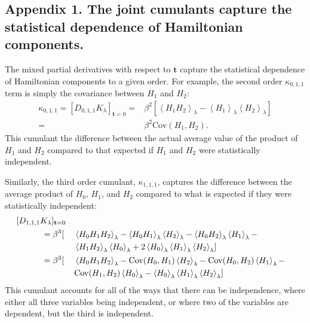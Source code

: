 \documentclass{article}
\let\vec\mathbf
\begin{document}
\subsection*{Appendix 1. The joint cumulants capture the statistical dependence of Hamiltonian components.}

The mixed partial derivatives with respect to $\vec t$ capture the statistical dependence of Hamiltonian components to a given order. For example, the second order $\kappa_{0,1,1}$ term is simply the covariance between $H_1$ and $H_2$:
\begin{align}
\kappa_{0, 1, 1} = [D_{0, 1, 1} K_\lambda]_{\vec t=0} =&
	\beta^2 \left[
    	\left\langle H_1 H_2 \right\rangle_\lambda -
		\left\langle H_1 \right\rangle_\lambda 
		\left\langle H_2 \right\rangle_\lambda
    \right] \nonumber\\
    =&
    \beta^2 \mathrm{Cov}(H_1,H_2).              
\end{align}
This cumulant the difference between the actual average value of the product of $H_1$ and $H_2$ compared to that expected if $H_1$ and $H_2$ were statistically independent.

Similarly, the third order cumulant, $\kappa_{1,1,1}$, captures the difference between the average product of $H_0$, $H_1$, and $H_2$ compared to what is expected if they were statistically independent:
\begin{alignat}{3}
\MoveEqLeft[3] [D_{1, 1, 1} K_\lambda]_{\vec t=0}\notag\\
&= \beta^3[ &&
\left\langle H_0 H_1 H_2 \right\rangle_\lambda -
\left\langle H_0 H_1 \right\rangle_\lambda
	\left\langle H_2 \right\rangle_\lambda -
\left\langle H_0 H_2 \right\rangle_\lambda
	\left\langle H_1 \right\rangle_\lambda - \notag\\
&&& \left\langle H_1 H_2 \right\rangle_\lambda
	\left\langle H_0 \right\rangle_\lambda +
2 \left\langle H_0 \right\rangle_\lambda
	\left\langle H_1 \right\rangle_\lambda
	\left\langle H_2 \right\rangle_\lambda]\notag\\
&= \beta^3[ &&
	\left\langle H_0 H_1 H_2 \right\rangle_\lambda -
	\mathrm{Cov}(H_0,H_1) \left\langle H_2 \right\rangle_\lambda -
	\mathrm{Cov}(H_0,H_2) \left\langle H_1 \right\rangle_\lambda -\\
	&&& \mathrm{Cov}(H_1,H_2) \left\langle H_0 \right\rangle_\lambda -
	\left\langle H_0 \right\rangle_\lambda
		\left\langle H_1 \right\rangle_\lambda
		\left\langle H_2 \right\rangle_\lambda]        
\end{alignat}
This cumulant accounts for all of the ways that there can be independence, where either all three variables being independent, or where two of the variables are dependent, but the third is independent.
\end{document}
